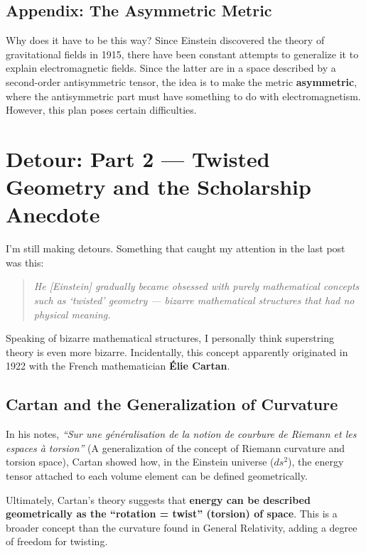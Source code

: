 \documentclass[11pt,a4paper,oneside]{article}
\newenvironment{fancyquote}
    {\begin{quote}\itshape\color{theoryblue!80!black}\guillemotleft\;}
    {\;\guillemotright\end{quote}}
\begin{document}
\subsection{Appendix: The Asymmetric Metric}

Why does it have to be this way? Since Einstein discovered the theory of gravitational fields in 1915, there have been constant attempts to generalize it to explain electromagnetic fields. Since the latter are in a space described by a second-order antisymmetric tensor, the idea is to make the metric \textbf{asymmetric}, where the antisymmetric part must have something to do with electromagnetism. However, this plan poses certain difficulties.


\section{Detour: Part 2 — Twisted Geometry and the Scholarship Anecdote}

I'm still making detours. Something that caught my attention in the last post was this:

\begin{fancyquote}
    He [Einstein] gradually became obsessed with purely mathematical concepts such as `twisted' geometry — bizarre mathematical structures that had no physical meaning.
\end{fancyquote}

Speaking of bizarre mathematical structures, I personally think superstring theory is even more bizarre. Incidentally, this concept apparently originated in 1922 with the French mathematician \textbf{Élie Cartan}.

\subsection{Cartan and the Generalization of Curvature}
In his notes, \textit{``Sur une généralisation de la notion de courbure de Riemann et les espaces à torsion''} (A generalization of the concept of Riemann curvature and torsion space), Cartan showed how, in the Einstein universe ($ds^2$), the energy tensor attached to each volume element can be defined geometrically.

Ultimately, Cartan's theory suggests that \textbf{energy can be described geometrically as the ``rotation = twist'' (torsion) of space}. This is a broader concept than the curvature found in General Relativity, adding a degree of freedom for twisting.
\end{document}

